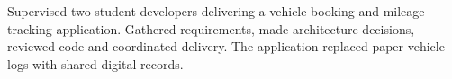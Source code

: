 Supervised two student developers delivering a vehicle booking and mileage-tracking application. Gathered requirements, made architecture decisions, reviewed code and coordinated delivery. The application replaced paper vehicle logs with shared digital records.

